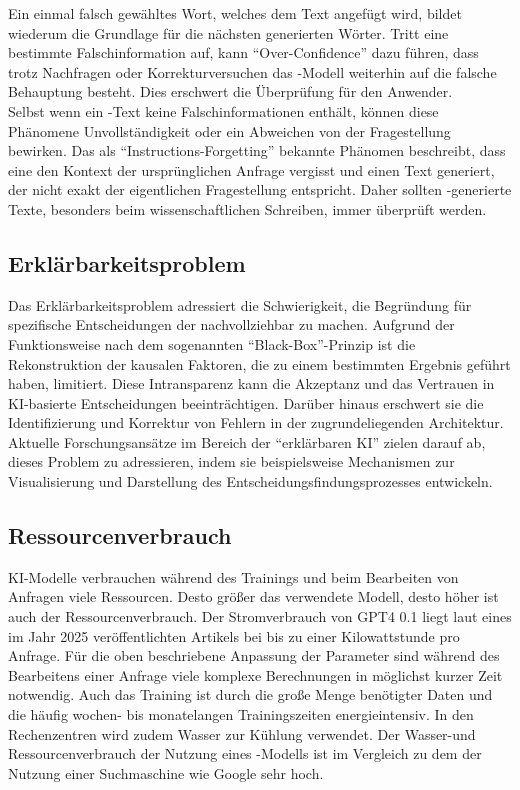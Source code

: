 \documentclass[../main.tex]{subfiles}
\begin{document}
Ein einmal falsch gewähltes Wort, welches dem Text angefügt wird, bildet wiederum die Grundlage für die nächsten generierten Wörter. Tritt eine bestimmte Falschinformation auf, 
kann "`Over-Confidence"' dazu führen, dass trotz Nachfragen oder Korrekturversuchen das -Modell weiterhin auf die falsche Behauptung besteht. Dies erschwert die 
Überprüfung für den Anwender.\cite{allgemHalluzinationen,softmax} \\
Selbst wenn ein -Text keine Falschinformationen enthält, können diese Phänomene Unvollständigkeit oder ein Abweichen von der Fragestellung bewirken. Das als 
"`Instructions-Forgetting"' bekannte Phänomen beschreibt, dass eine  den Kontext der ursprünglichen Anfrage vergisst und einen Text generiert, der nicht exakt der 
eigentlichen Fragestellung entspricht. Daher sollten -generierte Texte, besonders beim wissenschaftlichen Schreiben, immer überprüft werden.\cite{allgemHalluzinationen}


\subsection{Erklärbarkeitsproblem}
\label{sec:erklärbarkeitsproblem}

Das Erklärbarkeitsproblem adressiert die Schwierigkeit, die Begründung für spezifische Entscheidungen der  nachvollziehbar zu machen. Aufgrund der Funktionsweise nach dem sogenannten 
"`Black-Box"'-Prinzip ist die Rekonstruktion der kausalen Faktoren, die zu einem bestimmten Ergebnis geführt haben, limitiert. Diese Intransparenz kann die Akzeptanz und das Vertrauen in 
KI-basierte Entscheidungen beeinträchtigen. Darüber hinaus erschwert sie die Identifizierung und Korrektur von Fehlern in der zugrundeliegenden Architektur. Aktuelle Forschungsansätze 
im Bereich der "`erklärbaren KI"' zielen darauf ab, dieses Problem zu adressieren, indem sie beispielsweise Mechanismen zur Visualisierung und Darstellung des 
Entscheidungsfindungsprozesses entwickeln.\cite{explainable}
 

\subsection{Ressourcenverbrauch}

KI-Modelle verbrauchen während des Trainings und beim Bearbeiten von Anfragen viele Ressourcen. Desto größer das verwendete Modell, desto höher ist auch der Ressourcenverbrauch. 
Der Stromverbrauch von GPT4 0.1 liegt laut eines im Jahr 2025 veröffentlichten Artikels bei bis zu einer Kilowattstunde pro Anfrage\cite{Energieverbrauch}. Für die oben beschriebene Anpassung der Parameter sind während des Bearbeitens einer Anfrage viele 
komplexe Berechnungen in möglichst kurzer Zeit notwendig. Auch das Training ist durch die große Menge benötigter Daten und die häufig wochen- bis monatelangen Trainingszeiten 
energieintensiv. In den Rechenzentren wird zudem Wasser zur Kühlung verwendet. Der Wasser-und Ressourcenverbrauch der Nutzung eines -Modells ist im Vergleich zu dem der Nutzung einer 
Suchmaschine wie Google sehr hoch\cite{KINachhaltigkeit}. 
\end{document}
